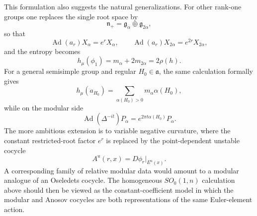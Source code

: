 \documentclass[11pt]{article}
\theoremstyle{definition}
\newcommand{\Ad}{\operatorname{Ad}}
\begin{document}
This formulation also suggests the natural generalizations.  For other rank-one groups
one replaces the single root space by
\[
\mathfrak n_+
=
\mathfrak g_\alpha\oplus\mathfrak g_{2\alpha},
\]
so that
\[
\Ad(a_r)X_\alpha=e^rX_\alpha,\qquad
\Ad(a_r)X_{2\alpha}=e^{2r}X_{2\alpha},
\]
and the entropy becomes
\[
h_\mu(\phi_1)
=
m_\alpha+2m_{2\alpha}
=
2\rho(h).
\]
For a general semisimple group and regular \(H_0\in\mathfrak a\), the same calculation
formally gives
\[
h_\mu(a_{H_0})
=
\sum_{\alpha(H_0)>0}
m_\alpha\alpha(H_0),
\]
while on the modular side
\[
\Ad(\Delta^{-it})P_\alpha
=
e^{2\pi t\alpha(H_0)}P_\alpha.
\]
The more ambitious extension is to variable negative curvature, where the constant
restricted-root factor \(e^r\) is replaced by the point-dependent unstable cocycle
\[
A^u(r,x)=D\phi_r|_{E^u(x)}.
\]
A corresponding family of relative modular data would amount to a modular analogue of an
Oseledets cocycle.  The homogeneous \(SO_0(1,n)\) calculation above should then be viewed
as the constant-coefficient model in which the modular and Anosov cocycles are both
representations of the same Euler-element action.
\end{document}
